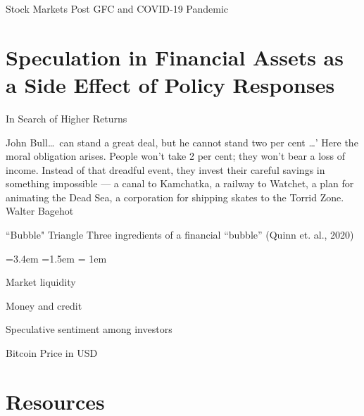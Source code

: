 \documentclass{beamer}
\begin{document}
\begin{frame}{Stock Markets Post GFC and COVID-19 Pandemic}

\begin{figure}[h!]
     \centering
     
\end{figure} 
	
\end{frame}

\section{Speculation in Financial Assets as a Side Effect of Policy Responses}

\begin{frame}{In Search of Higher Returns}
\begin{epigraph}
{John Bull\ldots\ can stand a great deal, but he cannot stand two per cent \ldots’ Here the moral obligation arises. People won't take 2 per cent; they won't bear a loss of income. Instead of that dreadful event, they invest their careful savings in something impossible --- a canal to Kamchatka, a railway to Watchet, a plan for animating the Dead Sea, a corporation for shipping skates to the Torrid Zone.}	
{Walter Bagehot}
\end{epigraph}
	
\end{frame}


\begin{frame}{``Bubble" Triangle}
Three ingredients of a financial ``bubble'' (Quinn et. al., 2020)
\begin{list}{\faChevronCircleRight}{\leftmargin=3.4em =1.5em 
\itemsep = 1em}
\item Market liquidity
\item Money and credit
\item Speculative sentiment among investors	
\end{list}
\end{frame}

\begin{frame}{Bitcoin Price in USD}

\centering
 
	
\end{frame}

\section{Resources}
\end{document}
